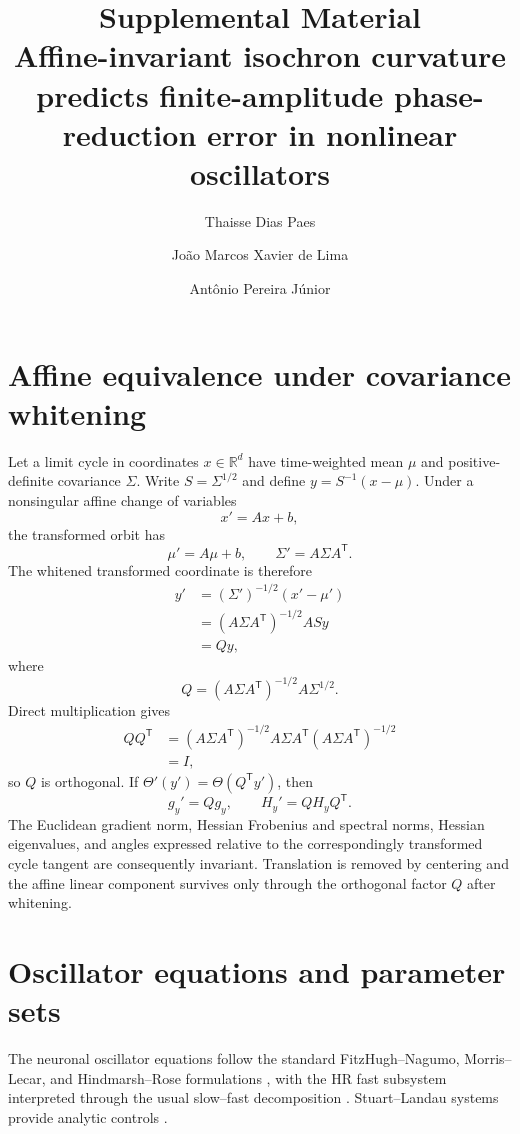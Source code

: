 \documentclass[11pt]{article}
\title{Supplemental Material\\\large Affine-invariant isochron curvature predicts finite-amplitude phase-reduction error in nonlinear oscillators}
\author{Thaisse Dias Paes \and Jo\~ao Marcos Xavier de Lima \and Ant\^onio Pereira J\'unior}
\date{}
\newcommand{\R}{\mathbb{R}}
\begin{document}
\maketitle

\section{Affine equivalence under covariance whitening}
Let a limit cycle in coordinates $x\in\R^d$ have time-weighted mean $\mu$ and positive-definite covariance $\Sigma$. Write $S=\Sigma^{1/2}$ and define $y=S^{-1}(x-\mu)$. Under a nonsingular affine change of variables
\begin{equation}
x'=Ax+b,
\end{equation}
the transformed orbit has
\begin{equation}
\mu'=A\mu+b,\qquad \Sigma'=A\Sigma A^{\mathsf T}.
\end{equation}
The whitened transformed coordinate is therefore
\begin{align}
y'&=(\Sigma')^{-1/2}(x'-\mu')\\
&=(A\Sigma A^{\mathsf T})^{-1/2}ASy\\
&=Qy,
\end{align}
where
\begin{equation}
Q=(A\Sigma A^{\mathsf T})^{-1/2}A\Sigma^{1/2}.
\end{equation}
Direct multiplication gives
\begin{align}
QQ^{\mathsf T}
&=(A\Sigma A^{\mathsf T})^{-1/2}A\Sigma A^{\mathsf T}(A\Sigma A^{\mathsf T})^{-1/2}\\
&=I,
\end{align}
so $Q$ is orthogonal. If $\Theta'(y')=\Theta(Q^{\mathsf T}y')$, then
\begin{equation}
g_y'=Qg_y,\qquad H_y'=QH_yQ^{\mathsf T}.
\end{equation}
The Euclidean gradient norm, Hessian Frobenius and spectral norms, Hessian eigenvalues, and angles expressed relative to the correspondingly transformed cycle tangent are consequently invariant. Translation is removed by centering and the affine linear component survives only through the orthogonal factor $Q$ after whitening.

\section{Oscillator equations and parameter sets}
The neuronal oscillator equations follow the standard FitzHugh--Nagumo, Morris--Lecar, and Hindmarsh--Rose formulations \cite{FitzHugh1961,MorrisLecar1981,HindmarshRose1984}, with the HR fast subsystem interpreted through the usual slow--fast decomposition \cite{Fenichel1979}. Stuart--Landau systems provide analytic controls \cite{Stuart1958}.
\end{document}
